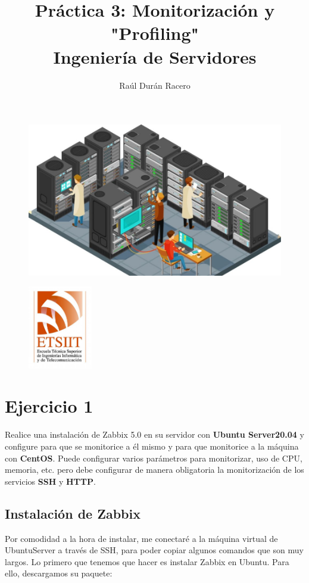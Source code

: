 \documentclass[a4paper]{article}
\begin{document}
\pagestyle{plain}
\title{Práctica 3: Monitorización y "Profiling" \\ 
Ingeniería de Servidores}
\author{Raúl Durán Racero}
\begin{figure}
    \centering
    \includegraphics[width=1.25\textwidth]{servers.pdf}
\end{figure}
\maketitle
\begin{figure}
    \centering
    \includegraphics[width=0.25\textwidth]{logoEtsiit.pdf}
\end{figure}

\newpage
\tableofcontents
\newpage
\section{Ejercicio 1}
Realice una instalación de Zabbix 5.0 en su servidor con \textbf{Ubuntu Server20.04} y configure
para que se monitorice a él mismo y para que monitorice a la máquina con \textbf{CentOS}.
Puede configurar varios parámetros para monitorizar, uso de CPU, memoria, etc. pero
debe configurar de manera obligatoria la monitorización de los servicios \textbf{SSH} y \textbf{HTTP}.
\subsection{Instalación de Zabbix}
Por comodidad a la hora de instalar, me conectaré a la máquina virtual de UbuntuServer
a través de SSH, para poder copiar algunos comandos que son muy largos.\newline
Lo primero que tenemos que hacer es instalar Zabbix en Ubuntu. Para ello, 
descargamos su paquete:
\end{document}
